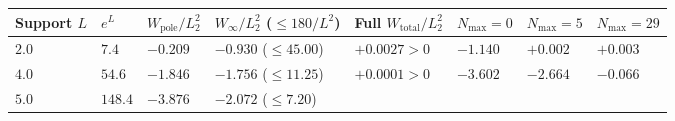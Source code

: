 \documentclass[
  11pt,
]{article}
\newcounter{none} %
\begin{document}
\begin{enumerate}
  {\def\LTcaptype{none} %
  \begin{longtable}[]{@{}
    >{\centering\arraybackslash}p{}
    >{\centering\arraybackslash}p{}
    >{\centering\arraybackslash}p{}
    >{\centering\arraybackslash}p{}
    >{\centering\arraybackslash}p{}
    >{\centering\arraybackslash}p{}
    >{\centering\arraybackslash}p{}
    >{\centering\arraybackslash}p{}@{}}
  \toprule\noalign{}
  \begin{minipage}[b]{\linewidth}\centering
  Support \(L\)
  \end{minipage} & \begin{minipage}[b]{\linewidth}\centering
  \(e^L\)
  \end{minipage} & \begin{minipage}[b]{\linewidth}\centering
  \(W_{\text{pole}}/L_2^2\)
  \end{minipage} & \begin{minipage}[b]{\linewidth}\centering
  \(W_\infty/L_2^2\) (\(\le 180/L^2\))
  \end{minipage} & \begin{minipage}[b]{\linewidth}\centering
  Full \(W_{\text{total}}/L_2^2\)
  \end{minipage} & \begin{minipage}[b]{\linewidth}\centering
  \(N_{\max} = 0\)
  \end{minipage} & \begin{minipage}[b]{\linewidth}\centering
  \(N_{\max} = 5\)
  \end{minipage} & \begin{minipage}[b]{\linewidth}\centering
  \(N_{\max} = 29\)
  \end{minipage} \\
  \midrule\noalign{}
  \endhead
  \bottomrule\noalign{}
  \endlastfoot
  \(2.0\) & \(7.4\) & \(-0.209\) & \(-0.930\) (\(\le 45.00\)) &
  \textbf{\(+0.0027 > 0\)} & \(-1.140\) & \(+0.002\) & \(+0.003\) \\
  \(4.0\) & \(54.6\) & \(-1.846\) & \(-1.756\) (\(\le 11.25\)) &
  \textbf{\(+0.0001 > 0\)} & \(-3.602\) & \(-2.664\) & \(-0.066\) \\
  \(5.0\) & \(148.4\) & \(-3.876\) & \(-2.072\) (\(\le 7.20\)) &

\end{longtable}}
\end{enumerate}
\end{document}
